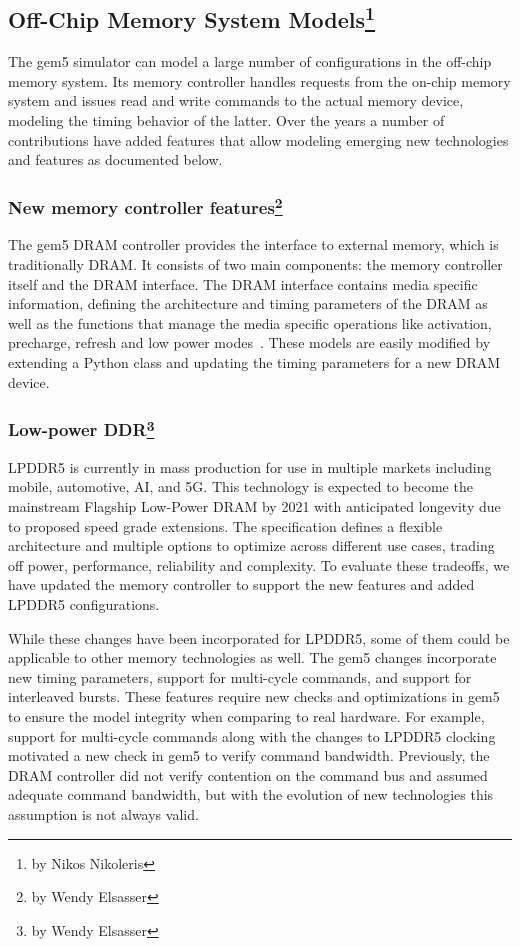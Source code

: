\subsection[Off-Chip Memory System Models]{Off-Chip Memory System Models\footnote{by Nikos Nikoleris}}
\label{sec:dramcontroller}

The gem5 simulator can model a large number of configurations in the off-chip memory system.
Its memory controller handles requests from the on-chip memory system and issues read and write commands to the actual memory device, modeling the timing behavior of the latter.
Over the years a number of contributions have added features that allow modeling emerging new technologies and features as documented below.

\subsubsection[New memory controller features]{New memory controller features\footnote{by Wendy Elsasser}}

The gem5 DRAM controller provides the interface to external memory, which is traditionally DRAM.
It consists of two main components: the memory controller itself and the DRAM interface.
The DRAM interface contains media specific information, defining the architecture and timing parameters of the DRAM as well as the functions that manage the media specific operations like activation, precharge, refresh and low power modes~\cite{HanssonAgarwal2014-gem5DRAM}.
These models are easily modified by extending a Python class and updating the timing parameters for a new DRAM device.

\subsubsection[Low-power DDR]{Low-power DDR\footnote{by Wendy Elsasser}}

LPDDR5 is currently in mass production for use in multiple markets including mobile, automotive, AI, and 5G.
This technology is expected to become the mainstream Flagship Low-Power DRAM by 2021 with anticipated longevity due to proposed speed grade extensions.
The specification defines a flexible architecture and multiple options to optimize across different use cases, trading off power, performance, reliability and complexity.
To evaluate these tradeoffs, we have updated the memory controller to support the new features and added LPDDR5 configurations.

While these changes have been incorporated for LPDDR5, some of them could be applicable to other memory technologies as well.
The gem5 changes incorporate new timing parameters, support for multi-cycle commands, and support for interleaved bursts.
These features require new checks and optimizations in gem5 to ensure the model integrity when comparing to real hardware.
For example, support for multi-cycle commands along with the changes to LPDDR5 clocking motivated a new check in gem5 to verify command bandwidth.
Previously, the DRAM controller did not verify contention on the command bus and assumed adequate command bandwidth, but with the evolution of new technologies this assumption is not always valid.

